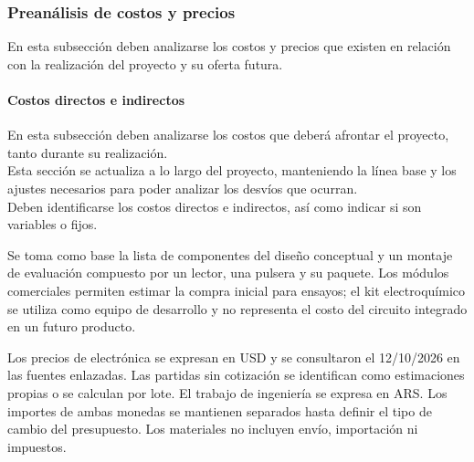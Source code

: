 \FloatBarrier
\subsubsection{Preanálisis de costos y precios}
{\consigna
En esta subsección deben analizarse los costos y precios que existen en relación con la realización del proyecto y su oferta futura.
}
    \paragraph{Costos directos e indirectos}
    {\consigna
    En esta subsección deben analizarse los costos que deberá afrontar el proyecto, tanto durante su realización.\\
    Esta sección se actualiza a lo largo del proyecto, manteniendo la línea base y los ajustes necesarios para poder analizar los desvíos que ocurran.\\
    Deben identificarse los costos directos e indirectos, así como indicar si son variables o fijos.
    }
    
\label{sec:costos}
Se toma como base la lista de componentes del diseño conceptual y un montaje de evaluación compuesto por un lector, una pulsera y su paquete. Los módulos comerciales permiten estimar la compra inicial para ensayos; el kit electroquímico se utiliza como equipo de desarrollo y no representa el costo del circuito integrado en un futuro producto.

Los precios de electrónica se expresan en USD y se consultaron el 12/10/2026 en las fuentes enlazadas. Las partidas sin cotización se identifican como estimaciones propias o se calculan por lote. El trabajo de ingeniería se expresa en ARS. Los importes de ambas monedas se mantienen separados hasta definir el tipo de cambio del presupuesto. Los materiales no incluyen envío, importación ni impuestos.

